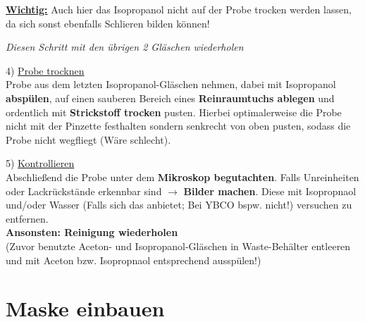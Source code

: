\documentclass[
  ngerman,
  twoside,
  captions=tableheading,
  BCOR=.5cm,
  fontsize=11,
  ]{scrreprt}
\begin{document}
\begin{description}
\underline{\textbf{Wichtig:}} Auch hier das Isopropanol nicht auf der Probe trocken werden lassen, da sich sonst ebenfalls Schlieren bilden können!
\begin{center}
\textit{Diesen Schritt mit den übrigen 2 Gläschen wiederholen}
\end{center}

\item 4) \underline{Probe trocknen}\\
Probe aus dem letzten Isopropanol-Gläschen nehmen, dabei mit Isopropanol \textbf{abspülen}, auf einen sauberen Bereich eines \textbf{Reinraumtuchs ablegen} und ordentlich mit \textbf{Strickstoff trocken} pusten. Hierbei optimalerweise die Probe nicht mit der Pinzette festhalten sondern senkrecht von oben pusten, sodass die Probe nicht wegfliegt (Wäre schlecht).\\

\item 5) \underline{Kontrollieren}\\
Abschließend die Probe unter dem \textbf{Mikroskop begutachten}. Falls Unreinheiten oder Lackrückstände erkennbar sind $\rightarrow$ \textbf{Bilder machen}.
Diese mit Isopropnaol und/oder Wasser (Falls sich das anbietet; Bei YBCO bspw. nicht!) versuchen zu entfernen.\\
\textbf{Ansonsten: Reinigung wiederholen}\\
(Zuvor benutzte Aceton- und Isopropanol-Gläschen in Waste-Behälter entleeren und mit Aceton bzw. Isopropnaol entsprechend ausspülen!)

\end{description}

\newpage

\chapter{Maske einbauen}
\end{document}

